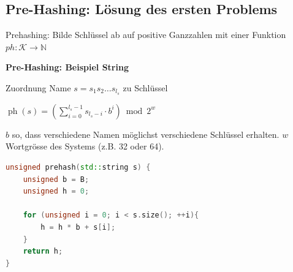 \begin{sectionbox}
\subsection{Pre-Hashing: Lösung des ersten Problems}\smallskip
Prehashing: Bilde Schlüssel ab auf positive Ganzzahlen mit einer Funktion $ph: \mathcal{K} \rightarrow \mathbb{N}$\par\smallskip
\textbf{Pre-Hashing: Beispiel String}\par
Zuordnung Name $s=s_{1} s_{2} \ldots s_{l_{s}}$ zu Schlüssel\par\smallskip
\begin{center}
    $\operatorname{ph}(s)=\left(\sum_{i=0}^{l_{s}-1} s_{l_{s}-i} \cdot b^{i}\right) \bmod 2^{w}$
\end{center}\par\smallskip
$b$ so, dass verschiedene Namen möglichst verschiedene Schlüssel erhalten.
$w$ Wortgrösse des Systems (z.B. 32 oder 64).\par\smallskip
\begin{lstlisting}[language=C++]
unsigned prehash(std::string s) {
    unsigned b = B;
    unsigned h = 0;
    
    for (unsigned i = 0; i < s.size(); ++i){
        h = h * b + s[i];
    }
    return h;
}
\end{lstlisting}\vspace{-6px}
\end{sectionbox}
\vspace{-4pt}
